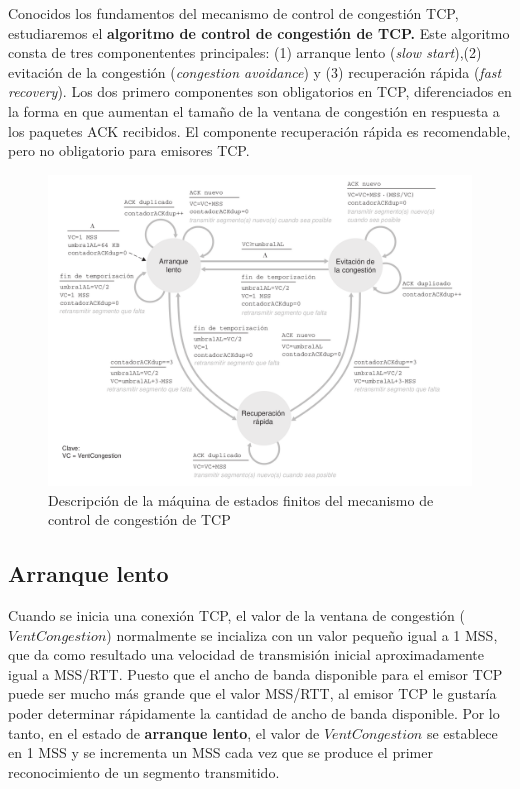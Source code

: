 \documentclass[a4paper,11pt]{article}
\begin{document}
Conocidos los fundamentos del mecanismo de control de congestión TCP, estudiaremos el \textbf{algoritmo de control de congestión de TCP.} Este algoritmo consta de tres componententes principales: (1) arranque lento (\textit{slow start}),(2) evitación de la congestión (\textit{congestion avoidance}) y (3) recuperación rápida (\textit{fast recovery}). Los dos primero componentes son obligatorios en TCP, diferenciados en la forma en que aumentan el tamaño de la ventana de congestión en respuesta a los paquetes ACK recibidos. El componente recuperación rápida es recomendable, pero no obligatorio para emisores TCP.

\begin{figure}[h]
\centering
\caption{Descripción de la máquina de estados finitos del mecanismo de control de congestión de TCP}
\includegraphics[scale=1,width=1.1\textwidth]{diagrama_estados_congestion.png}
\end{figure}

\subsection*{Arranque lento}
Cuando se inicia una conexión TCP, el valor de la ventana de congestión ($VentCongestion$) normalmente se incializa con un valor pequeño igual a 1 MSS, que da como resultado una velocidad de transmisión inicial aproximadamente igual a MSS/RTT. Puesto que el ancho de banda disponible para el emisor TCP puede ser mucho más grande que el valor MSS/RTT, al emisor TCP le gustaría poder determinar rápidamente la cantidad de ancho de banda disponible. Por lo tanto, en el estado de \textbf{arranque lento}, el valor de $VentCongestion$ se establece en 1 MSS y se incrementa un MSS cada vez que se produce el primer reconocimiento de un segmento transmitido.
\end{document}
